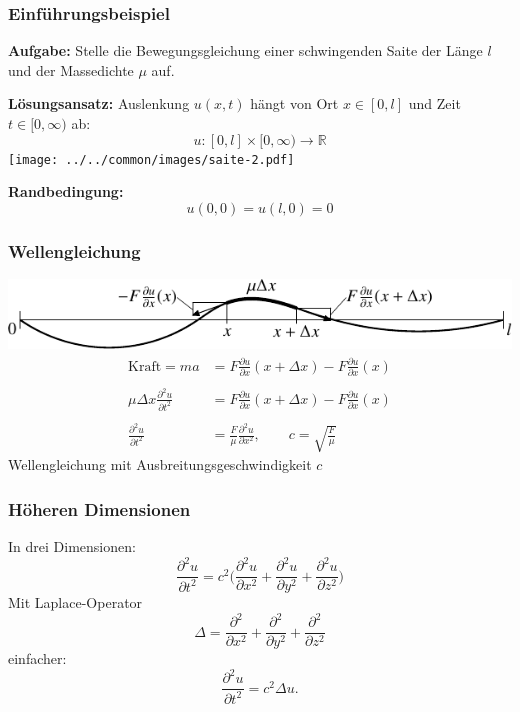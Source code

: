 %
%
%
\begin{frame}
\frametitle{Einführungsbeispiel}

{\bf Aufgabe:} Stelle die Bewegungsgleichung
einer schwingenden Saite der Länge $l$ und der Massedichte $\mu$ auf.

\medskip
\pause
{\bf Lösungsansatz:}
Auslenkung $ u(x,t)$ hängt von Ort $x\in[0,l]$ und Zeit $t\in[0,\infty)$
ab:
\[
u\colon [0,l]\times [0,\infty)\to \mathbb R
\]
\pause
\medskip
\texttt{[image: ../../common/images/saite-2.pdf]}
\pause
\medskip

{\bf Randbedingung:}
\[
u(0,0)= u(l,0)=0
\]
\end{frame}


\begin{frame}
\frametitle{Wellengleichung}
\includegraphics{../../common/images/saite-1.pdf}
\begin{align*}
\text{Kraft}
=ma
&=
F\frac{\partial u}{\partial x}(x+\Delta x)-F\frac{\partial u}{\partial x}(x)
\\
\\
\mu \Delta x \frac{\partial^2  u}{\partial t^2}
&=
F\frac{\partial u}{\partial x}(x+\Delta x)-F\frac{\partial u}{\partial x}(x)
\\
\\
\frac{\partial^2  u}{\partial t^2}
&=
\frac{F}{\mu}
\frac{\partial^2 u}{\partial x^2},
\qquad
c=\sqrt{\frac{F}{\mu}}
\end{align*}
Wellengleichung mit Ausbreitungsgeschwindigkeit $c$
\end{frame}

\begin{frame}
\frametitle{Höheren Dimensionen}
In drei Dimensionen:
\[
\frac{\partial^2 u}{\partial t^2}=c^2
\biggl(
\frac{\partial^2 u}{\partial x^2}
+
\frac{\partial^2 u}{\partial y^2}
+
\frac{\partial^2 u}{\partial z^2}
\biggr)
\]
\pause
Mit Laplace-Operator
\[
\Delta
=
\frac{\partial^2}{\partial x^2}
+
\frac{\partial^2}{\partial y^2}
+
\frac{\partial^2}{\partial z^2}
\]
\pause
einfacher:
\[
\frac{\partial^2 u}{\partial t^2}
=
c^2\Delta  u.
\]
\end{frame}



